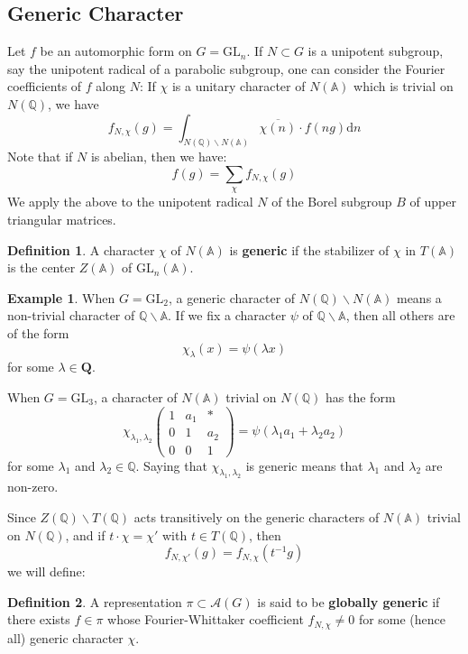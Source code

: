 \documentclass[11pt,english]{smfart}
\theoremstyle{definition}
\newtheorem{definition}{Definition}
\newtheorem{example}{Example}
\theoremstyle{remark}
\begin{document}
\subsection{Generic Character}
Let $ f $ be an automorphic form on $ G=\mathrm{GL}_{n} $. If $ N \subset G $ is a unipotent subgroup, say the unipotent radical of a parabolic subgroup, one can consider the Fourier coefficients of $ f $ along $ N $: If $ \chi $ is a unitary character of $ N(\mathbb{A}) $ which is trivial on $ N(\mathbb{Q}) $, we have
\[f_{N, \chi}(g)=\int_{N(\mathbb{Q}) \backslash N(\mathbb{A})} \overline{\chi(n)} \cdot f(n g) \mathrm{d} n\]
Note that if $ N $ is abelian, then we have:
\[f(g)=\sum_{\chi} f_{N, \chi}(g)\]
We apply the above to the unipotent radical $ N $ of the Borel subgroup $ B $ of upper triangular matrices.
\begin{definition}
A character $ \chi $ of $ N(\mathbb{A}) $ is \textbf{generic} if the stabilizer of $ \chi $ in $ T(\mathbb{A}) $ is the center $ Z(\mathbb{A}) $ of $\mathrm{ G L}_{n}(\mathbb{A}) $.
\end{definition}
\begin{example}
    When $ G=\mathrm{GL}_{2} $, a generic character of $ N  (\mathbb{Q})  \backslash N  (\mathbb{A})$ means a non-trivial character of $ \mathbb{Q} \backslash \mathbb{A} $.
    If we fix a character $ \psi $ of $ \mathbb{Q} \backslash \mathbb{A} $, then all others are of the form
    \[\chi_{\lambda}(x)=\psi(\lambda x)\]
    for some $ \lambda \in \mathbf{Q} $.
    
    When $ G=\mathrm{GL}_{3} $, a character of $ N(\mathbb{A}) $ trivial on $ N(\mathbb{Q}) $ has the form
    \[\chi_{\lambda_{1}, \lambda_{2}}\left(\begin{array}{ccc}
    1 & a_{1} & * \\
    0 & 1 & a_{2} \\
    0 & 0 & 1
    \end{array}\right)=\psi\left(\lambda_{1} a_{1}+\lambda_{2} a_{2}\right)\]
    for some $ \lambda_{1} $ and $ \lambda_{2} \in \mathbb{Q} $.
    Saying that $ \chi_{\lambda_{1}, \lambda_{2}} $ is generic means that $ \lambda_{1} $ and $ \lambda_{2}  $ are non-zero.        
\end{example}
Since $Z(\mathbb{Q}) \backslash T(\mathbb{Q})$ acts transitively on the generic characters of $N(\mathbb{A})$ trivial on $N(\mathbb{Q})$, and if $t \cdot \chi=\chi'$ with $t\in T(\mathbb{Q})$,
then
\[f_{N,\chi'} (g)=f_{N,\chi} (t^{-1}g)\]
we will define:
\begin{definition}
A representation $\pi \subset \mathcal{A}(G)$ is said to be \textbf{globally generic} if there exists $f\in \pi$ whose Fourier-Whittaker coefficient $f_{N,\chi} \neq 0$ for some (hence all) generic character $\chi$.
\end{definition}
\end{document}
